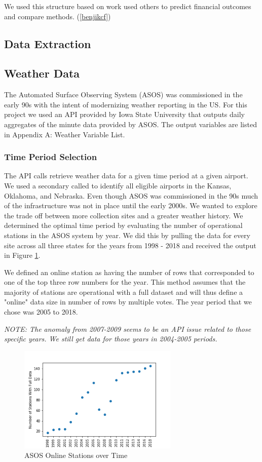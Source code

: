 \documentclass[twoside,11pt]{article}
\begin{document}
We used this structure based on work used others to predict financial outcomes and compare methods. (\ref{benjikcf})

\subsection{Data Extraction}

\subsection{Weather Data}
	The Automated Surface Observing System (ASOS) was commissioned in the early 90s with the intent of modernizing weather reporting in the US. For this project we used an API provided by Iowa State University that outputs daily aggregates of the minute data provided by ASOS. The output variables are listed in Appendix A: Weather Variable List.
	
	\subsubsection{Time Period Selection}
	The API calls retrieve weather data for a given time period at a given airport. We used a secondary called to identify all eligible airports in the Kansas, Oklahoma, and Nebraska. Even though ASOS was commissioned in the 90s much of the infrastructure was not in place until the early 2000s. We wanted to explore the trade off between more collection sites and a greater weather history. We determined the optimal time period by evaluating the number of operational stations in the ASOS system by year. We did this by pulling the data for every site across all three states for the years from 1998 - 2018 and received the output in Figure \ref{fig:asosstations}. 
	
	We defined an online station as having the number of rows that corresponded to one of the top three row numbers for the year. This method assumes that the majority of stations are operational with a full dataset and will thus define a "online" data size in number of rows by multiple votes. The year period that we chose was 2005 to 2018.
	
	\textit{NOTE: The anomaly from 2007-2009 seems to be an API issue related to those specific years. We still get data for those years in 2004-2005 periods.}
	
	\begin{figure}[htbp]
		\centering
		\includegraphics[width=3in]{ASOSstations.png}
		\caption{ASOS Online Stations over Time}
		\label{fig:asosstations}
	\end{figure}
\end{document}
